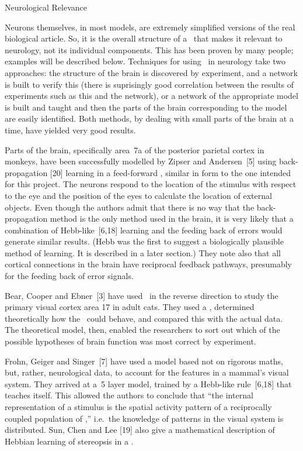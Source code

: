 \sec Neurological Relevance

Neurons themselves, in most models, are extremely simplified versions of
the real biological article.
So, it is the overall structure of a \nn\ that makes it relevant to
neurology, not its individual components.
This has been proven by many people; examples will be described
below.
Techniques for using \nns\ in neurology take two approaches: the structure of the
brain is discovered by experiment, and a network is built to verify this
(there is suprisingly good correlation between the results of
experiments such as this and the network), or a network of the
appropriate model is built and taught and then the parts of the brain
corresponding to the model are easily identified.
Both methods, by dealing with small parts of the brain at a time, have
yielded very good results.

Parts of the brain, specifically area~7a of the posterior parietal
cortex in monkeys, have been successfully modelled by Zipser and
Andersen~[5] using
back-propagation [20] learning in a feed-forward \nn, similar in form to the
one intended for this project.
The neurons respond to the location of the stimulus with respect to the
eye and the position of the eyes to calculate the location of external
objects.
Even though the authors admit that there is no way
that the back-propagation method is the only method used in the brain,
it is very likely that a combination of Hebb-like~[6,18] learning and
the feeding back of errors would generate similar results. (Hebb was the
first to suggest a biologically plausible method of learning. 
It is described in a later section.)
They note also that all cortical connections in the brain have
reciprocal feedback pathways, presumably for the feeding back of error
signals.

Bear, Cooper and Ebner~[3] have used \nns\ in the reverse direction to
study the primary visual cortex area 17 in adult cats.
They used a \nn, determined theoretically how the \neus\ could behave,
and compared this with the actual data.
The theoretical model, then, enabled the researchers to sort out which
of the possible hypotheses of brain function was most correct by experiment.

Frohn, Geiger and Singer~[7] have used a model based not on rigorous
maths, but, rather, neurological data, to account for the features in a
mammal's visual system.
They arrived at a~5 layer model, trained by a Hebb-like rule~[6,18] that
teaches itself.
This allowed the authors to conclude that ``the internal representation
of a stimulus is the spatial activity pattern of a reciprocally coupled
population of \neus,'' i.e.\ the knowledge of patterns in the visual system
is distributed.
Sun, Chen and Lee [19] also give a mathematical description of Hebbian
learning of stereopsis in a \nn.

